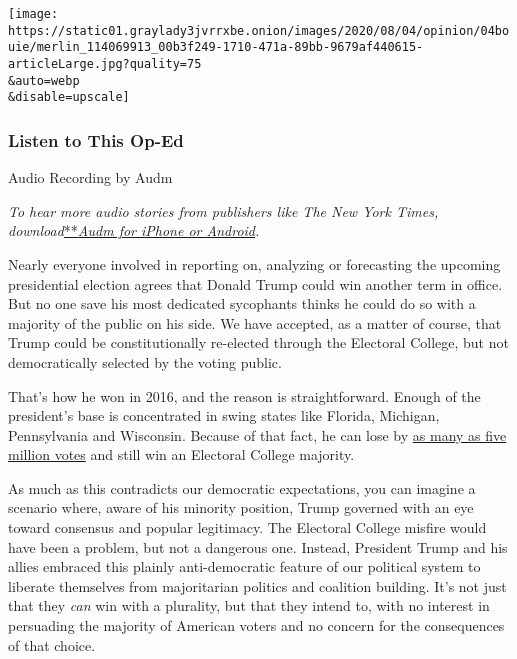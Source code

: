 \texttt{[image: https://static01.graylady3jvrrxbe.onion/images/2020/08/04/opinion/04bouie/merlin\_114069913\_00b3f249-1710-471a-89bb-9679af440615-articleLarge.jpg?quality=75\\\&auto=webp\\\&disable=upscale]}

\hypertarget{listen-to-this-op-ed}{%
\subsubsection{Listen to This Op-Ed}\label{listen-to-this-op-ed}}

Audio Recording by Audm

\emph{To hear more audio stories from publishers like The New York
Times,
download}\href{https://www.audm.com/?utm_source=nytmag\&utm_medium=embed\&utm_campaign=left_behind_draper}{**}\href{https://www.audm.com/?utm_source=nytopinion\&utm_medium=embed\&utm_campaign=trump_votes_want}{\emph{Audm
for iPhone or Android}}\emph{.}

Nearly everyone involved in reporting on, analyzing or forecasting the
upcoming presidential election agrees that Donald Trump could win
another term in office. But no one save his most dedicated sycophants
thinks he could do so with a majority of the public on his side. We have
accepted, as a matter of course, that Trump could be constitutionally
re-elected through the Electoral College, but not democratically
selected by the voting public.

That's how he won in 2016, and the reason is straightforward. Enough of
the president's base is concentrated in swing states like Florida,
Michigan, Pennsylvania and Wisconsin. Because of that fact, he can lose
by
\href{https://www.nbcnews.com/politics/2020-election/how-trump-could-lose-5-million-votes-still-win-2020-n1031601}{as
many as five million votes} and still win an Electoral College majority.

As much as this contradicts our democratic expectations, you can imagine
a scenario where, aware of his minority position, Trump governed with an
eye toward consensus and popular legitimacy. The Electoral College
misfire would have been a problem, but not a dangerous one. Instead,
President Trump and his allies embraced this plainly anti-democratic
feature of our political system to liberate themselves from majoritarian
politics and coalition building. It's not just that they \emph{can} win
with a plurality, but that they intend to, with no interest in
persuading the majority of American voters and no concern for the
consequences of that choice.

